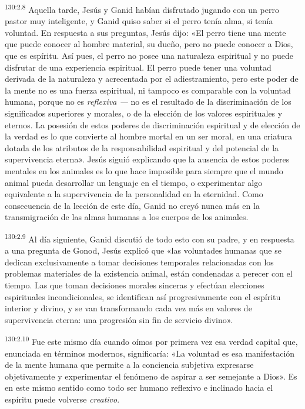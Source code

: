 \par 
\textsuperscript{130:2.8} Aquella tarde, Jesús y Ganid habían disfrutado jugando con un perro pastor muy inteligente, y Ganid quiso saber si el perro tenía alma, si tenía voluntad. En respuesta a sus preguntas, Jesús dijo: «El perro tiene una mente que puede conocer al hombre material, su dueño, pero no puede conocer a Dios, que es espíritu. Así pues, el perro no posee una naturaleza espiritual y no puede disfrutar de una experiencia espiritual. El perro puede tener una voluntad derivada de la naturaleza y acrecentada por el adiestramiento, pero este poder de la mente no es una fuerza espiritual, ni tampoco es comparable con la voluntad humana, porque no es \textit{reflexiva ---} no es el resultado de la discriminación de los significados superiores y morales, o de la elección de los valores espirituales y eternos. La posesión de estos poderes de discriminación espiritual y de elección de la verdad es lo que convierte al hombre mortal en un ser moral, en una criatura dotada de los atributos de la responsabilidad espiritual y del potencial de la supervivencia eterna». Jesús siguió explicando que la ausencia de estos poderes mentales en los animales es lo que hace imposible para siempre que el mundo animal pueda desarrollar un lenguaje en el tiempo, o experimentar algo equivalente a la supervivencia de la personalidad en la eternidad. Como consecuencia de la lección de este día, Ganid no creyó nunca más en la transmigración de las almas humanas a los cuerpos de los animales.

\par 
\textsuperscript{130:2.9} Al día siguiente, Ganid discutió de todo esto con su padre, y en respuesta a una pregunta de Gonod, Jesús explicó que «las voluntades humanas que se dedican exclusivamente a tomar decisiones temporales relacionadas con los problemas materiales de la existencia animal, están condenadas a perecer con el tiempo. Las que toman decisiones morales sinceras y efectúan elecciones espirituales incondicionales, se identifican así progresivamente con el espíritu interior y divino, y se van transformando cada vez más en valores de supervivencia eterna: una progresión sin fin de servicio divino».

\par 
\textsuperscript{130:2.10} Fue este mismo día cuando oímos por primera vez esa verdad capital que, enunciada en términos modernos, significaría: «La voluntad es esa manifestación de la mente humana que permite a la conciencia subjetiva expresarse objetivamente y experimentar el fenómeno de aspirar a ser semejante a Dios». Es en este mismo sentido como todo ser humano reflexivo e inclinado hacia el espíritu puede volverse \textit{creativo}.


